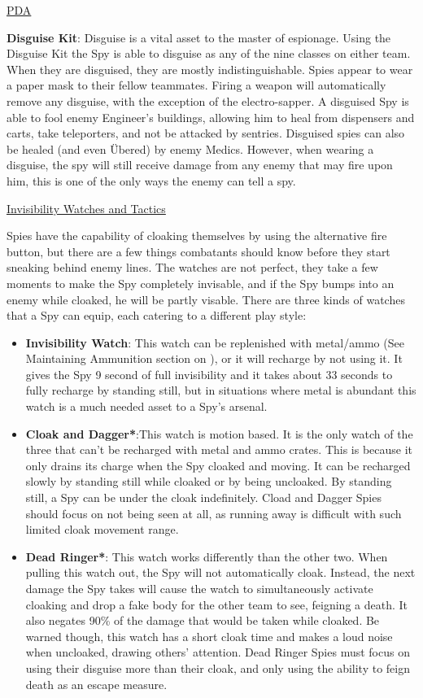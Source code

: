 \begin {center}
\underline {PDA}
\end {center}

{\bf Disguise Kit}: Disguise is a vital asset to the master of espionage.  Using the Disguise Kit the Spy is able to disguise as any of the nine classes on either team. When they are disguised, they are mostly indistinguishable.  Spies appear to wear a paper mask to their fellow teammates. Firing a weapon will automatically remove any disguise, with the exception of the electro-sapper. A disguised Spy is able to fool enemy Engineer's buildings, allowing him to heal from dispensers and carts, take teleporters, and not be attacked by sentries.  Disguised spies can also be healed (and even Übered) by enemy Medics. However, when wearing a disguise, the spy will still receive damage from any enemy that may fire upon him, this is one of the only ways the enemy can tell a spy.

\begin {center}
\underline {Invisibility Watches and Tactics}
\end {center}

 Spies have the capability of cloaking themselves by using the alternative fire button, but there are a few things combatants should know before they start sneaking behind enemy lines. The watches are not perfect, they take a few moments to make the Spy completely invisable, and if the Spy bumps into an enemy while cloaked, he will be partly visable. There are three kinds of watches that a Spy can equip, each catering to a different play style:
\begin {itemize}
\item {\bf Invisibility Watch}: This watch can be replenished with metal/ammo (See Maintaining Ammunition section on \pageref{Maintaining_Ammunition}), or it will recharge by not using it. It gives the Spy 9 second of full invisibility and it takes about 33 seconds to fully recharge by standing still, but in situations where metal is abundant this watch is a much needed asset to a Spy's arsenal.
\item {\bf Cloak and Dagger*}:This watch is motion based. It is the only watch of the three that can't be recharged with metal and ammo crates. This is because it only drains its charge when the Spy cloaked and moving. It can be recharged slowly by standing still while cloaked or by being uncloaked. By standing still, a Spy can be under the cloak indefinitely. Cload and Dagger Spies should focus on not being seen at all, as running away is difficult with such limited cloak movement range.
\item {\bf Dead Ringer*}: This watch works differently than the other two. When pulling this watch out, the Spy will not automatically cloak. Instead, the next damage the Spy takes will cause the watch to simultaneously activate cloaking and drop a fake body for the other team to see, feigning a death. It also negates 90\% of the damage that would be taken while cloaked. Be warned though, this watch has a short cloak time and makes a loud noise when uncloaked, drawing others' attention. Dead Ringer Spies must focus on using their disguise more than their cloak, and only using the ability to feign death as an escape measure.
\end {itemize}
